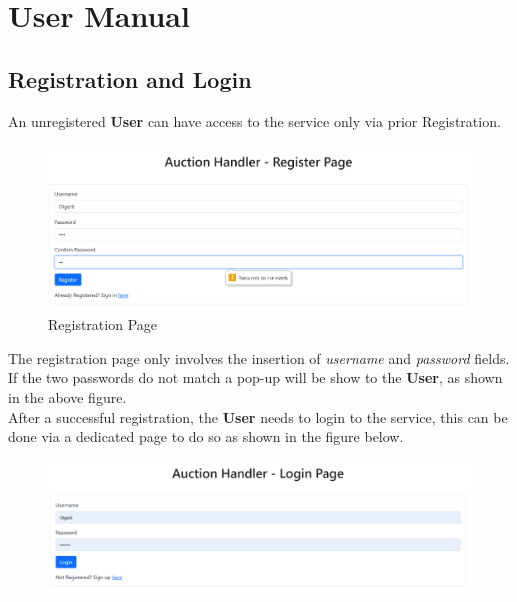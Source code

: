 \section{User Manual}
\subsection{Registration and Login}
An unregistered \textbf{User} can have access to the service only via prior Registration.\\

\begin{figure}[H]
	\centering
	\includegraphics[width=\textwidth]{img/registration}
	\caption{Registration Page}
	\label{fig:registration}
\end{figure}

The registration page only involves the insertion of \textit{username} and \textit{password} fields. If the two passwords do not match a pop-up will be show to the \textbf{User}, as shown in the above figure.\\

\noindent After a successful registration, the \textbf{User} needs to login to the service, this can be done via a dedicated page to do so as shown in the figure below.

\begin{figure}[H]
	\centering
	\includegraphics[width=\textwidth]{img/login}
	\caption{}
	\label{fig:login}
\end{figure}

